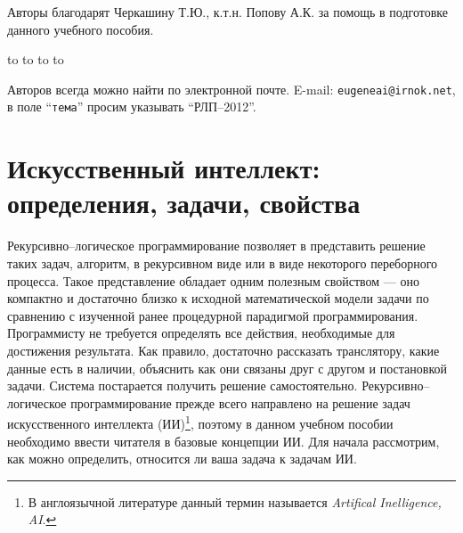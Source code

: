 \documentclass[12pt, openany, twoside]{book} %
\begin{document}
Авторы благодарят Черкашину  Т.Ю., к.т.н. Попову А.К. за помощь в подготовке данного учебного пособия.

\medskip
\noindent\hbox to \linewidth{\hfill\sf С.н.с. ИДСТУ СО РАН, доцента кафедр ВТ ИрГТУ и ИТ ИМЭИ ИГУ}
\noindent\hbox to \linewidth{\hfill\sf к.т.н. Е.А.Черкашин}
\noindent\hbox to \linewidth{\hfill\sf аспирант кафедры ИТ ИМЭИ ИГУ}
\noindent\hbox to \linewidth{\hfill\sf И.Н.Терехин}

\vfill
\makeatletter
{} Авторов всегда можно найти по электронной почте. E-mail:
{\tt eugeneai@irnok.net}, в поле ``{\tt тема}'' просим указывать ``РЛП--2012''.
\makeatother

\chapter{Искусственный интеллект: определения, задачи, свойства}

Рекурсивно--логическое программирование позволяет в представить решение таких задач, алгоритм, в рекурсивном виде или в виде некоторого переборного процесса. Такое представление обладает одним полезным свойством --- оно компактно и достаточно близко к исходной математической модели задачи по сравнению с изученной ранее процедурной парадигмой программирования. Программисту не требуется определять все действия, необходимые для достижения результата. Как правило, достаточно рассказать транслятору, какие данные есть в наличии, объяснить как они связаны друг с другом и постановкой задачи. Система постарается получить решение самостоятельно. Рекурсивно--логическое программирование прежде всего направлено на решение задач искусственного интеллекта (ИИ)\footnote{В англоязычной литературе данный термин называется \emph{Artifical Inelligence, AI}. }, поэтому в данном учебном пособии необходимо ввести читателя в базовые концепции ИИ. Для начала рассмотрим, как можно определить, относится ли ваша задача к задачам ИИ.
\end{document}
